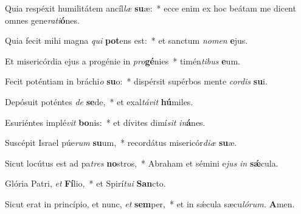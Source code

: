 \item Quia respéxit humilitátem ancíl\hspace{0.03em}\textit{læ} \textbf{su}æ:~* ecce enim ex hoc beátam me dicent omnes gene\textit{rati}\textbf{ó}nes.
\item Quia fecit mihi magna \textit{qui} \textbf{pot}ens est:~* et san\-ctum \textit{nomen} \textbf{e}jus.
\item Et misericórdia ejus a progénie in \textit{pro}\hspace{0.03em}\textbf{gé}nies~* timén\textit{tibus} \textbf{e}um.
\item Fecit poténtiam in bráchi\textit{o} \textbf{su}o:~* dispérsit supérbos mente \textit{cordis} \textbf{su}i.
\item Depósuit poténtes \textit{de} \textbf{se}de,~* et exal\textit{távit} \textbf{hú}miles.
\item Esuriéntes implé\textit{vit} \textbf{bo}nis:~* et dívites dimí\textit{sit} \textit{in}\textbf{á}nes.
\item Suscépit Israel púe\textit{rum} \textbf{su}um,~* recordátus misericór\textit{diæ} \textbf{su}æ.
\item Sicut locútus est ad pa\hspace{0.03em}\textit{tres} \textbf{no}stros,~* Abraham et sémini e\textit{jus} \textit{in} \textbf{sǽ}cula.
\item Glória Patri, \textit{et} \textbf{Fí}lio,~* et Spirí\hspace{0.03em}\textit{tui} \textbf{San}cto.
\item Sicut erat in princípio, et nunc, \textit{et} \textbf{sem}per,~* et in sǽcula sæcu\hspace{0.03em}\textit{lórum.} \textbf{A}men.
